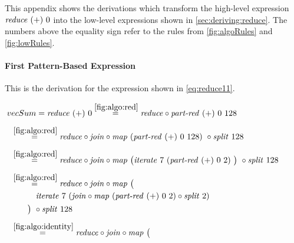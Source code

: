 This appendix shows the derivations which transform the high-level expression $\text{\textit{reduce}}\ (+)\ 0$ into the low-level expressions shown in \autoref{sec:deriving:reduce}.
The numbers above the equality sign refer to the rules from \autoref{fig:algoRules} and \autoref{fig:lowRules}.

\paragraph{First Pattern-Based Expression}
This is the derivation for the expression shown in \autoref{eq:reduce11}.

\small

\begin{align*}
  &\hspace{-1.5em}vecSum = \reduce\ (+)\ 0
%
  \overset{\ref{fig:algo:red}}{=\hspace{.2em}}
      \reduce \circ \partRed\ (+)\ 0\ 128\\[.5em]
%
  &\hspace{-2em}\quad\begin{aligned}
    &\overset{\ref{fig:algo:red}}{=\hspace{.2em}}
      \reduce \circ \join \circ \map\ (\partRed\ (+)\ 0\ 128)\ \circ \splitN\ 128
  \end{aligned}\\[.5em]
%
  &\hspace{-2em}\quad\begin{aligned}
    &\overset{\ref{fig:algo:red}}{=\hspace{.2em}}
      \reduce \circ \join \circ \map\ \big(\iterateN\ 7\ (\partRed\ (+)\ 0\ 2)\ \big)\ \circ \splitN\ 128
  \end{aligned}\\[.5em]
%
  &\hspace{-2em}\quad\begin{aligned}
    &\overset{\ref{fig:algo:red}}{=\hspace{.2em}}
      \reduce \circ \join \circ \map\ \big(\\
    &\qquad\quad\iterateN\ 7\ (\join \circ \map\ (\partRed\ (+)\ 0\ 2) \circ \splitN\ 2)\\
    &\qquad\big)\ \circ \splitN\ 128
  \end{aligned}\\[.5em]
%
  &\hspace{-2em}\quad\begin{aligned}
    &\overset{\ref{fig:algo:identity}}{=\hspace{.2em}}
      \reduce \circ \join \circ \map\ \big(\\

\end{aligned}
\end{align*}
